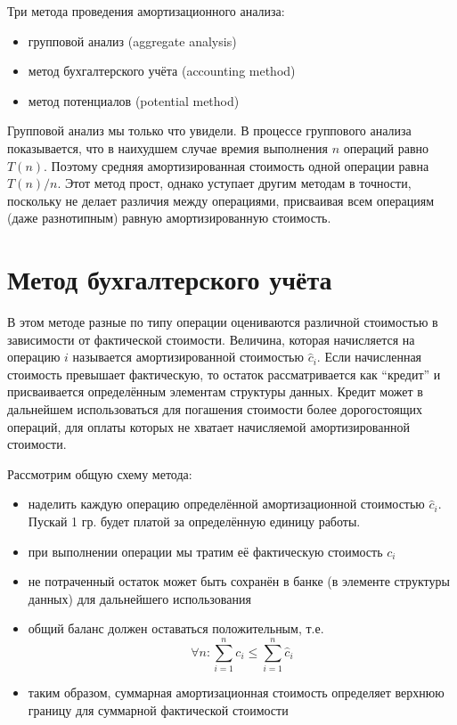 \documentclass[a4paper,11pt]{article}
\begin{document}
Три метода проведения амортизационного анализа:

\begin{itemize}
\item групповой анализ (aggregate analysis)
\item метод бухгалтерского учёта (accounting method)
\item метод потенциалов (potential method)
\end{itemize}

Групповой анализ мы только что увидели. В процессе группового анализа
показывается, что в наихудшем случае времия выполнения $n$ операций равно $T(n)$.
Поэтому средняя амортизированная стоимость одной операции равна $T(n)/n$. Этот
метод прост, однако уступает другим методам в точности, поскольку не делает
различия между операциями, присваивая всем операциям (даже разнотипным) равную
амортизированную стоимость.

\section{Метод бухгалтерского учёта}

В этом методе разные по типу операции оцениваются различной стоимостью в
зависимости от фактической стоимости. Величина, которая начисляется на операцию
$i$ называется амортизированной стоимостью $\hat{c}_i$. Если начисленная
стоимость превышает фактическую, то остаток рассматривается как ``кредит'' и
присваивается определённым элементам структуры данных. Кредит может в дальнейшем
использоваться для погашения стоимости более дорогостоящих операций, для оплаты
которых не хватает начисляемой амортизированной стоимости.

Рассмотрим общую схему метода:

\begin{itemize}
\item наделить каждую операцию определённой амортизационной стоимостью
  $\hat{c}_i$. Пускай 1 гр. будет платой за определённую единицу работы.
\item при выполнении операции мы тратим её фактическую стоимость $c_i$
\item не потраченный остаток может быть сохранён в банке (в элементе структуры
  данных) для дальнейшего использования
\item общий баланс должен оставаться положительным, т.е.
$$ \forall{n}: \sum_{i=1}^n c_i \leqslant \sum_{i=1}^n \hat{c}_i $$
\item таким образом, суммарная амортизационная стоимость определяет верхнюю
  границу для суммарной фактической стоимости
\end{itemize}
\end{document}
